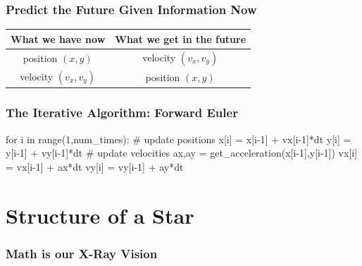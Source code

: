 \documentclass[]{beamer}
\begin{document}
\begin{frame}
  \frametitle{Predict the Future Given Information Now}
  \begin{Large}
  \begin{center}
    \begin{tabular}{c | c}
      What we have now & What we get in the future \\
      \hline
      position $(x,y)$ & velocity $(v_x,v_y)$ \\ 
      [1ex]
      velocity $(v_x,v_y)$ & position $(x,y)$
    \end{tabular}
  \end{center}
\end{Large}
\end{frame}

\begin{frame}[fragile]
  \frametitle{The Iterative Algorithm: Forward Euler}
\begin{python}
for i in range(1,num_times):
    # update positions
    x[i] = x[i-1] + vx[i-1]*dt
    y[i] = y[i-1] + vy[i-1]*dt
    # update velocities
    ax,ay = get_acceleration(x[i-1],y[i-1])
    vx[i] = vx[i-1] + ax*dt
    vy[i] = vy[i-1] + ay*dt
\end{python}
\end{frame}

\section{Structure of a Star}
\label{sec:star}

\begin{frame}
  \frametitle{Math is our X-Ray Vision}
\end{frame}
\end{document}

